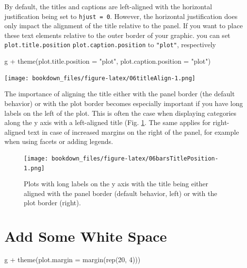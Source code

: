 \documentclass[
]{krantz}
\makeatletter
\newenvironment{Shaded}{\begin{snugshade}}{\end{snugshade}}
\newcommand{\AttributeTok}[1]{\textcolor[rgb]{0.61,0.61,0.61}{#1}}
\newcommand{\DecValTok}[1]{\textcolor[rgb]{0.06,0.06,0.06}{#1}}
\newcommand{\FunctionTok}[1]{\textcolor[rgb]{0,0,0}{#1}}
\newcommand{\NormalTok}[1]{#1}
\newcommand{\SpecialCharTok}[1]{\textcolor[rgb]{0,0,0}{#1}}
\newcommand{\StringTok}[1]{\textcolor[rgb]{0.5,0.5,0.5}{#1}}
\newenvironment{kframe}{%
\medskip{}
\setlength{\fboxsep}{.8em}
 \def\at@end@of@kframe{}%
 \ifinner\ifhmode%
  \def\at@end@of@kframe{\end{minipage}}%
  \begin{minipage}{\columnwidth}%
 \fi\fi%
 \def\FrameCommand##1{\hskip\@totalleftmargin \hskip-\fboxsep
 \colorbox{shadecolor}{##1}\hskip-\fboxsep
     \hskip-\linewidth \hskip-\@totalleftmargin \hskip\columnwidth}%
 \MakeFramed {\advance\hsize-\width
   \@totalleftmargin\z@ \linewidth\hsize
   \@setminipage}}%
 {\par\unskip\endMakeFramed%
 \at@end@of@kframe}
\renewenvironment{Shaded}{\begin{kframe}}{\end{kframe}}
\makeatother
\begin{document}
By default, the titles and captions are left-aligned with the horizontal justification being set to \texttt{hjust\ =\ 0}. However, the horizontal justification does only impact the alignment of the title relative to the panel. If you want to place these text elements relative to the outer border of your graphic. you can set \texttt{plot.title.position} \texttt{plot.caption.position} to \texttt{"plot"}, respectively

\begin{Shaded}
\begin{Highlighting}[]
\NormalTok{g }\SpecialCharTok{+} \FunctionTok{theme}\NormalTok{(}\AttributeTok{plot.title.position =} \StringTok{"plot"}\NormalTok{,}
          \AttributeTok{plot.caption.position =} \StringTok{"plot"}\NormalTok{)}
\end{Highlighting}
\end{Shaded}

\texttt{[image: bookdown\_files/figure-latex/06titleAlign-1.png]}

The importance of aligning the title either with the panel border (the default behavior) or with the plot border becomes especially important if you have long labels on the left of the plot. This is often the case when displaying categories along the y axis with a left-aligned title (Fig. \ref{fig:06barsTitlePosition}. The same applies for right-aligned text in case of increased margins on the right of the panel, for example when using facets or adding legends.

\begin{figure}
\centering
\texttt{[image: bookdown\_files/figure-latex/06barsTitlePosition-1.png]}
\caption{\label{fig:06barsTitlePosition}Plots with long labels on the y axis with the title being either aligned with the panel border (default behavior, left) or with the plot border (right).}
\end{figure}

\hypertarget{add-some-white-space-1}{%
\section{Add Some White Space}\label{add-some-white-space-1}}

\begin{Shaded}
\begin{Highlighting}[]
\NormalTok{g }\SpecialCharTok{+} \FunctionTok{theme}\NormalTok{(}\AttributeTok{plot.margin =} \FunctionTok{margin}\NormalTok{(}\FunctionTok{rep}\NormalTok{(}\DecValTok{20}\NormalTok{, }\DecValTok{4}\NormalTok{)))}
\end{Highlighting}
\end{Shaded}
\end{document}
